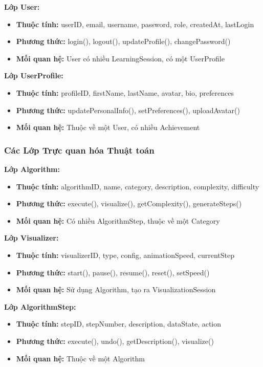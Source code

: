\textbf{Lớp User:}
\begin{itemize}
    \item \textbf{Thuộc tính:} userID, email, username, password, role, createdAt, lastLogin
    \item \textbf{Phương thức:} login(), logout(), updateProfile(), changePassword()
    \item \textbf{Mối quan hệ:} User có nhiều LearningSession, có một UserProfile
\end{itemize}

\textbf{Lớp UserProfile:}
\begin{itemize}
    \item \textbf{Thuộc tính:} profileID, firstName, lastName, avatar, bio, preferences
    \item \textbf{Phương thức:} updatePersonalInfo(), setPreferences(), uploadAvatar()
    \item \textbf{Mối quan hệ:} Thuộc về một User, có nhiều Achievement
\end{itemize}

\subsubsection{Các Lớp Trực quan hóa Thuật toán}

\textbf{Lớp Algorithm:}
\begin{itemize}
    \item \textbf{Thuộc tính:} algorithmID, name, category, description, complexity, difficulty
    \item \textbf{Phương thức:} execute(), visualize(), getComplexity(), generateSteps()
    \item \textbf{Mối quan hệ:} Có nhiều AlgorithmStep, thuộc về một Category
\end{itemize}

\textbf{Lớp Visualizer:}
\begin{itemize}
    \item \textbf{Thuộc tính:} visualizerID, type, config, animationSpeed, currentStep
    \item \textbf{Phương thức:} start(), pause(), resume(), reset(), setSpeed()
    \item \textbf{Mối quan hệ:} Sử dụng Algorithm, tạo ra VisualizationSession
\end{itemize}

\textbf{Lớp AlgorithmStep:}
\begin{itemize}
    \item \textbf{Thuộc tính:} stepID, stepNumber, description, dataState, action
    \item \textbf{Phương thức:} execute(), undo(), getDescription(), visualize()
    \item \textbf{Mối quan hệ:} Thuộc về một Algorithm
\end{itemize}

